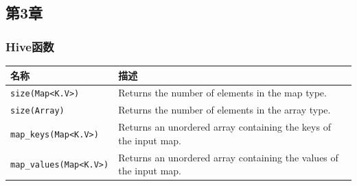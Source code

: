 \documentclass[
]{article}
\begin{document}
\hypertarget{ux7b2c3ux7ae0}{%
\subsection{第3章}\label{ux7b2c3ux7ae0}}

\hypertarget{hiveux51fdux6570}{%
\subsubsection{Hive函数}\label{hiveux51fdux6570}}

\begin{longtable}[]{@{}ll@{}}
\toprule
\begin{minipage}[b]{0.39\columnwidth}\raggedright
名称\strut
\end{minipage} & \begin{minipage}[b]{0.55\columnwidth}\raggedright
描述\strut
\end{minipage}\tabularnewline
\midrule
\endhead
\begin{minipage}[t]{0.39\columnwidth}\raggedright
\texttt{size(Map\textless{}K.V\textgreater{})}\strut
\end{minipage} & \begin{minipage}[t]{0.55\columnwidth}\raggedright
Returns the number of elements in the map type.\strut
\end{minipage}\tabularnewline
\begin{minipage}[t]{0.39\columnwidth}\raggedright
\texttt{size(Array)}\strut
\end{minipage} & \begin{minipage}[t]{0.55\columnwidth}\raggedright
Returns the number of elements in the array type.\strut
\end{minipage}\tabularnewline
\begin{minipage}[t]{0.39\columnwidth}\raggedright
\texttt{map\_keys(Map\textless{}K.V\textgreater{})}\strut
\end{minipage} & \begin{minipage}[t]{0.55\columnwidth}\raggedright
Returns an unordered array containing the keys of the input map.\strut
\end{minipage}\tabularnewline
\begin{minipage}[t]{0.39\columnwidth}\raggedright
\texttt{map\_values(Map\textless{}K.V\textgreater{})}\strut
\end{minipage} & \begin{minipage}[t]{0.55\columnwidth}\raggedright
Returns an unordered array containing the values of the input map.\strut
\end{minipage}\tabularnewline

\end{longtable}
\end{document}
